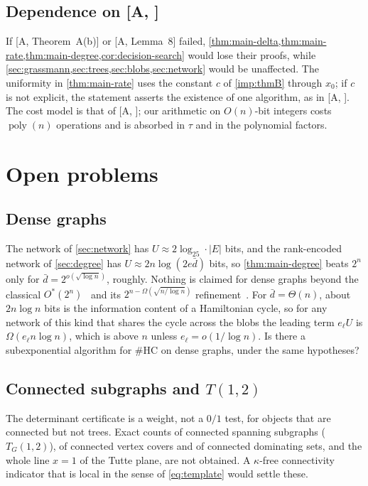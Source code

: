 \documentclass[11pt]{amsart}
\theoremstyle{plain}
\theoremstyle{definition}
\theoremstyle{remark}
\numberwithin{equation}{section}
\newcommand{\HC}{\#\mathrm{HC}}
\newcommand{\poly}{\operatorname{poly}}
\newcommand{\A}[1][]{\textup{[A\if\relax\detokenize{#1}\relax\else, #1\fi]}}
\begin{document}
\subsection{Dependence on \texorpdfstring{\A}{[A]}}
If \A[Theorem~A(b)] or \A[Lemma~8] failed,
\cref{thm:main-delta,thm:main-rate,thm:main-degree,cor:decision-search} would lose their proofs, while \cref{sec:grassmann,sec:trees,sec:blobs,sec:network} would be
unaffected. The uniformity in \cref{thm:main-rate} uses the constant $c$ of \cref{imp:thmB}
through $x_0$; if $c$ is not explicit, the statement asserts the existence of one algorithm, as in
\A. The cost model is that of \A; our arithmetic on $O(n)$-bit integers costs $\poly(n)$
operations and is absorbed in $\tau$ and in the polynomial factors.

\section{Open problems}\label{sec:open}

\subsection{Dense graphs} The network of \cref{sec:network} has $U\approx2\log_25\cdot|E|$ bits,
and the rank-encoded network of \cref{sec:degree} has $U\approx2n\log(2e\bar d)$ bits, so
\cref{thm:main-degree} beats $2^n$ only for $\bar d=2^{o(\sqrt{\log n})}$, roughly. Nothing is
claimed for dense graphs beyond the classical $O^*(2^n)$~\cite{Karp82,Bax93} and its
$2^{n-\Omega(\sqrt{n/\log n})}$ refinement~\cite{Bjorklund16}. For $\bar d=\Theta(n)$, about $2n\log n$
bits is the information content of a Hamiltonian cycle, so for any network of this kind that
shares the cycle across the blobs the leading term $e_\ell U$ is $\Omega(e_\ell n\log n)$, which is
above $n$ unless $e_\ell=o(1/\log n)$. Is
there a subexponential algorithm for $\HC$ on dense graphs, under the same hypotheses?

\subsection{Connected subgraphs and \texorpdfstring{$T(1,2)$}{T(1,2)}} The determinant certificate is a weight, not a $0/1$
test, for objects that are connected but not trees. Exact counts of connected spanning subgraphs
($T_G(1,2)$), of connected vertex covers and of connected dominating sets, and the whole line
$x=1$ of the Tutte plane, are not obtained. A $\kappa$-free connectivity indicator that is local
in the sense of \eqref{eq:template} would settle these.
\end{document}
